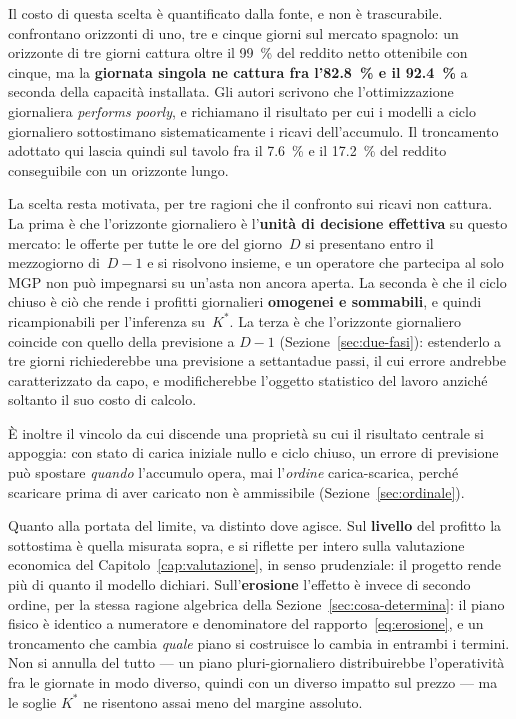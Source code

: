 Il costo di questa scelta \`e quantificato dalla fonte, e non \`e trascurabile.
\textcite{alonsoperez2026storage} confrontano orizzonti di uno, tre e cinque giorni sul
mercato spagnolo: un orizzonte di tre giorni cattura oltre il \SI{99}{\percent} del reddito
netto ottenibile con cinque, ma la \textbf{giornata singola ne cattura fra l'\SI{82,8}{\percent}
e il \SI{92,4}{\percent}} a seconda della capacit\`a installata. Gli autori scrivono che
l'ottimizzazione giornaliera \emph{performs poorly}, e richiamano il risultato per cui i
modelli a ciclo giornaliero sottostimano sistematicamente i ricavi dell'accumulo. Il
troncamento adottato qui lascia quindi sul tavolo fra il \SI{7,6}{\percent} e il
\SI{17,2}{\percent} del reddito conseguibile con un orizzonte lungo.

La scelta resta motivata, per tre ragioni che il confronto sui ricavi non cattura. La prima
\`e che l'orizzonte giornaliero \`e l'\textbf{unit\`a di decisione effettiva} su questo
mercato: le offerte per tutte le ore del giorno~$D$ si presentano entro il mezzogiorno
di~$D-1$ e si risolvono insieme, e un operatore che partecipa al solo \ac{MGP} non pu\`o
impegnarsi su un'asta non ancora aperta. La seconda \`e che il ciclo chiuso \`e ci\`o che
rende i profitti giornalieri \textbf{omogenei e sommabili}, e quindi ricampionabili per
l'inferenza su~$K^*$. La terza \`e che l'orizzonte giornaliero coincide con quello della
previsione a $D-1$ (Sezione~\ref{sec:due-fasi}): estenderlo a tre giorni richiederebbe una
previsione a settantadue passi, il cui errore andrebbe caratterizzato da capo, e
modificherebbe l'oggetto statistico del lavoro anzich\'e soltanto il suo costo di calcolo.

\`E inoltre il vincolo da cui discende una propriet\`a su cui il risultato centrale si
appoggia: con stato di carica iniziale nullo e ciclo chiuso, un errore di previsione pu\`o
spostare \emph{quando} l'accumulo opera, mai l'\emph{ordine} carica-scarica, perch\'e
scaricare prima di aver caricato non \`e ammissibile (Sezione~\ref{sec:ordinale}).

Quanto alla portata del limite, va distinto dove agisce. Sul \textbf{livello} del profitto la
sottostima \`e quella misurata sopra, e si riflette per intero sulla valutazione economica del
Capitolo~\ref{cap:valutazione}, in senso prudenziale: il progetto rende pi\`u di quanto il
modello dichiari. Sull'\textbf{erosione} l'effetto \`e invece di secondo ordine, per la stessa
ragione algebrica della Sezione~\ref{sec:cosa-determina}: il piano fisico \`e identico a
numeratore e denominatore del rapporto~\eqref{eq:erosione}, e un troncamento che cambia
\emph{quale} piano si costruisce lo cambia in entrambi i termini. Non si annulla del tutto ---
un piano pluri-giornaliero distribuirebbe l'operativit\`a fra le giornate in modo diverso,
quindi con un diverso impatto sul prezzo --- ma le soglie $K^*$ ne risentono assai meno del
margine assoluto.

